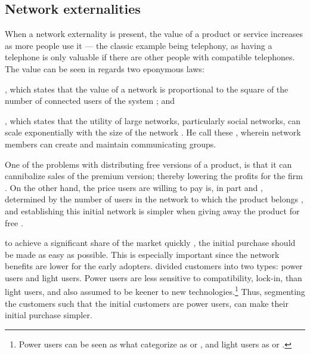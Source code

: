 \subsection{Network externalities}
\label{section:free:networkexternalities}

When a network externality is present, the value of a product or service increases as more people use it \citep{katz1985} --- the classic example being telephony, as having a telephone is only valuable if there are other people with compatible telephones. The value can be seen in regards two eponymous laws:
\begin{inparaenum}[\itshape 1\upshape)]
  \item {}, which states that the value of a network is proportional to the square of the number of connected users of the system \citep{metcalfe1995,shapiro1999,hendler2008}; and
  \item {}, which states that the utility of large networks, particularly social networks, can scale exponentially with the size of the network \citep{reed2001}. He call these , wherein network members can create and maintain communicating groups.
\end{inparaenum} 

One of the problems with distributing free versions of a product, is that it can cannibalize sales of the premium version; thereby lowering the profits for the firm \citep{haruvy1998}. On the other hand, the price users are willing to pay is, in part and , determined by the number of users in the network to which the product belongs \citep{brynjolfsson1996}, and establishing this initial network is simpler when giving away the product for free \citep{haruvy2001}.

 to achieve a significant share of the market quickly \citep{brynjolfsson1996,katz1992}, the initial purchase should be made as easy as possible. This is especially important since the network benefits are lower for the early adopters. \citet{lee2003} divided customers into two types: power users and light users. Power users are less sensitive to compatibility, \eg lock-in, than light users, and also assumed to be keener to new technologies.\footnote{Power users can be seen as what \citet{moore2002} categorize as  or , and light users as  or .} Thus, segmenting the customers such that the initial customers are power users, can make their initial purchase simpler.

